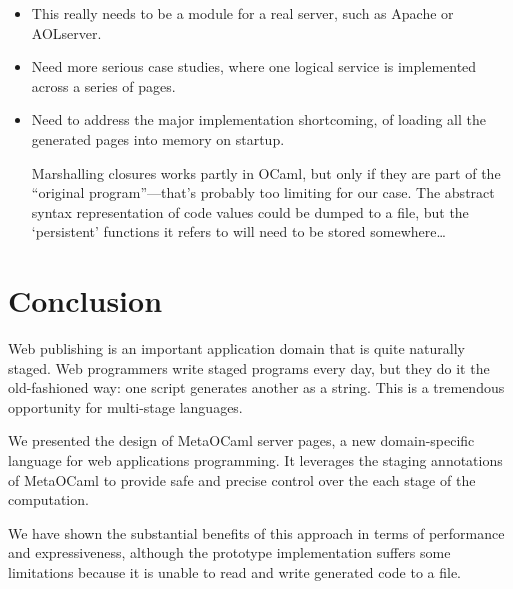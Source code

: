 \documentclass[preprint]{acm_proc_article-sp}
\def\MOC{MetaOCaml}
\begin{document}
\begin{itemize}
  
\item This really needs to be a module for a real server, such
  as Apache or AOLserver.
  
\item Need more serious case studies, where one logical service
  is implemented across a series of pages.
  
\item Need to address the major implementation shortcoming, of
  loading all the generated pages into memory on startup.
  
  Marshalling closures works partly in OCaml, but only if they
  are part of the ``original program''---that's probably too
  limiting for our case.  The abstract syntax representation of
  code values could be dumped to a file, but the `persistent'
  functions it refers to will need to be stored somewhere\ldots

\end{itemize}


\section{Conclusion}
\label{sec:concl}

Web publishing is an important application domain that is quite
naturally staged.  Web programmers write staged programs every
day, but they do it the old-fashioned way: one script generates
another as a string.  This is a tremendous opportunity for
multi-stage languages.

We presented the design of \MOC{} server pages, a new
domain-specific language for web applications programming.  It
leverages the staging annotations of \MOC{} to provide safe and
precise control over the each stage of the computation.

We have shown the substantial benefits of this approach in terms
of performance and expressiveness, although the prototype
implementation suffers some limitations because it is unable to
read and write generated code to a file.



\raggedright

\end{document}
